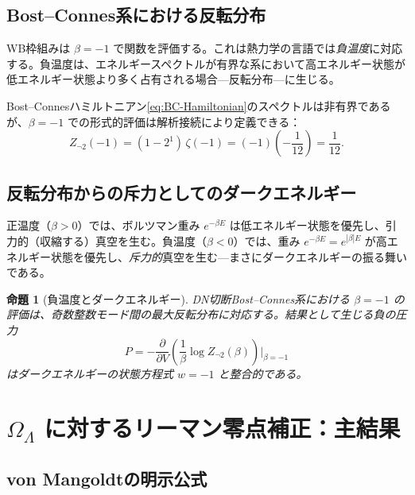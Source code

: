 \documentclass[12pt,a4paper]{article}
\newtheorem{proposition}[theorem]{命題}
\newcommand{\OL}{\Omega_\Lambda}
\begin{document}
\subsection{Bost--Connes系における反転分布}

WB枠組みは $\beta = -1$ で関数を評価する。これは熱力学の言語では\emph{負温度}に対応する。負温度は、エネルギースペクトルが有界な系において高エネルギー状態が低エネルギー状態より多く占有される場合---反転分布---に生じる。

Bost--Connesハミルトニアン\eqref{eq:BC-Hamiltonian}のスペクトルは非有界であるが、$\beta = -1$ での形式的評価は解析接続により定義できる：
\begin{equation}
  Z_{\neg 2}(-1) = (1 - 2^{1})\,\zeta(-1) = (-1)\!\left(-\frac{1}{12}\right) = \frac{1}{12}.
\end{equation}

\subsection{反転分布からの斥力としてのダークエネルギー}

正温度（$\beta > 0$）では、ボルツマン重み $e^{-\beta E}$ は低エネルギー状態を優先し、引力的（収縮する）真空を生む。負温度（$\beta < 0$）では、重み $e^{-\beta E} = e^{|\beta|E}$ が高エネルギー状態を優先し、\emph{斥力的}真空を生む---まさにダークエネルギーの振る舞いである。

\begin{proposition}[負温度とダークエネルギー]
DN切断Bost--Connes系における $\beta = -1$ の評価は、奇数整数モード間の最大反転分布に対応する。結果として生じる負の圧力
\begin{equation}
  P = -\frac{\partial}{\partial V}\left(\frac{1}{\beta}\log Z_{\neg 2}(\beta)\right)\bigg|_{\beta=-1}
\end{equation}
はダークエネルギーの状態方程式 $w = -1$ と整合的である。
\end{proposition}

\section{$\OL$ に対するリーマン零点補正：主結果}
\label{sec:main}

\subsection{von Mangoldtの明示公式}
\end{document}
